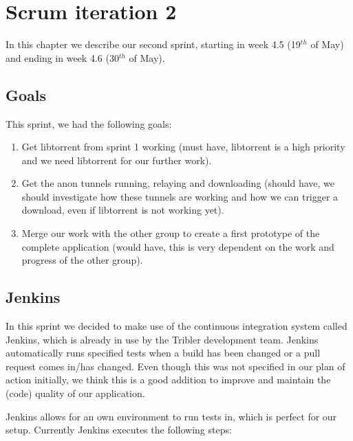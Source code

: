 \chapter{Scrum iteration 2}
\label{iteration2}
	In this chapter we describe our second sprint, starting in week 4.5 (19$^{th}$ of May) and ending in week 4.6 (30$^{th}$ of May).

	\section{Goals}
		This sprint, we had the following goals:
	
		\begin{enumerate}
			\item Get libtorrent from sprint 1 working (must have, libtorrent is a high priority and we need libtorrent for our further work).
			\item Get the anon tunnels running, relaying and downloading (should have, we should investigate how these tunnels are working and how we can trigger a download, even if libtorrent is not working yet).
			\item Merge our work with the other group to create a first prototype of the complete application (would have, this is very dependent on the work and progress of the other group).
		\end{enumerate}
	
	\section{Jenkins}
		In this sprint we decided to make use of the continuous integration system called Jenkins, which is already in use by the Tribler development team. Jenkins automatically runs specified tests when a build has been changed or a pull request comes in/has changed. 
		Even though this was not specified in our plan of action initially, we think this is a good addition to improve and maintain the (code) quality of our application.
		
		Jenkins allows for an own environment to run tests in, which is perfect for our setup. Currently Jenkins executes the following steps:
		

